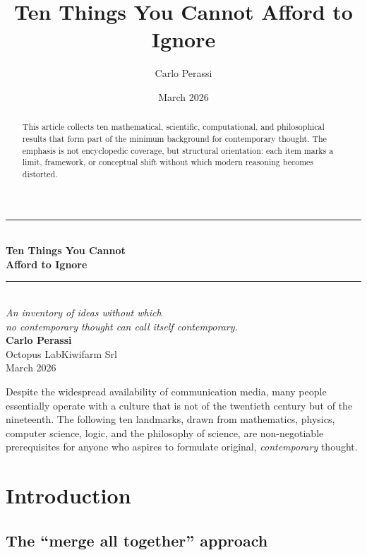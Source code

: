 \documentclass[11pt,a4paper]{article}
\title{Ten Things You Cannot Afford to Ignore}
\author{Carlo Perassi}
\date{March 2026}
\begin{document}
	
	\thispagestyle{empty}
	\vspace*{2.5cm}
	
	\begin{center}
		{\color{accent}\rule{0.4\textwidth}{1pt}}\\[1.2em]
		{\fontsize{28}{34}\selectfont\bfseries\color{deep}
			Ten Things You Cannot\\[0.15em] Afford to Ignore}\\[1.2em]
		{\color{accent}\rule{0.4\textwidth}{1pt}}\\[2em]
		{\large\color{steel}\itshape
			An inventory of ideas without which\\[0.3em]
			no contemporary thought can call itself contemporary.}\\[3em]
		{\color{deep}\bfseries Carlo Perassi}\\[0.3em]
		{\small\color{steel} Octopus Lab\enspace\textperiodcentered\enspace Kiwifarm Srl}\\[0.3em]
		{\small\color{steel} March 2026}
	\end{center}
	
	\vfill
	
	\noindent\textcolor{steel}{\small
		Despite the widespread availability of communication media, many people
		essentially operate with a culture that is not of the twentieth century
		but of the nineteenth. The following ten landmarks, drawn from
		mathematics, physics, computer science, logic, and the philosophy of
		science, are non-negotiable prerequisites for anyone who aspires to
		formulate original, \emph{contemporary} thought.}
	
	\newpage

\begin{abstract}
\noindent This article collects ten mathematical, scientific, computational,
and philosophical results that form part of the minimum background for
contemporary thought. The emphasis is not encyclopedic coverage, but structural
orientation: each item marks a limit, framework, or conceptual shift without
which modern reasoning becomes distorted.
\end{abstract}

\section*{Introduction}

\subsection*{The ``merge all together'' approach}
\end{document}
